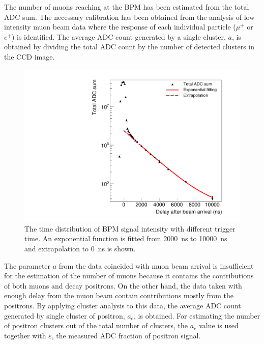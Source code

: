 \documentclass[preprint,3p,twocolumn]{elsarticle}
\begin{document}
The number of muons reaching at the BPM has been estimated from the total ADC sum. The necessary calibration has been obtained from the analysis of low intensity muon beam data where the response of each individual particle ($\mu^+$ or $e^+$) is identified. The average ADC count generated by a single cluster, $a$, is obtained by dividing the total ADC count by the number of detected clusters in the CCD image.
\begin{figure}[btp]
	\centering
	\includegraphics[width=\columnwidth]{figure/Decay_v3.pdf}
	\caption{The time distribution of BPM signal intensity with different trigger time. An exponential function is fitted from \SI{2000}{\ns} to \SI{10000}{\ns} and extrapolation to \SI{0}{\ns} is shown.}
	\label{fig:time_distribution}
\end{figure}

The parameter $a$ from the data coincided with muon beam arrival is insufficient for the estimation of the number of muons because it contains the contributions of both muons and decay positrons. On the other hand, the data taken with enough delay from the muon beam contain contributions mostly from the positrons. By applying cluster analysis to this data, the average ADC count generated by single cluster of positron, $a_e$, is obtained. For estimating the number of positron clusters out of the total number of clusters, the $a_e$ value is used together with $\varepsilon$, the measured ADC fraction of positron signal.
\end{document}
